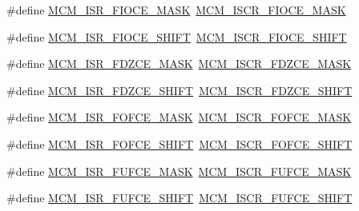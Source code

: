 \begin{DoxyCompactItemize}
\item 
\#define \mbox{\hyperlink{group___s_d_k___compatibility___symbols_ga8c2d933b91a6be29be3c45a9120d1a6d}{M\+C\+M\+\_\+\+I\+S\+R\+\_\+\+F\+I\+O\+C\+E\+\_\+\+M\+A\+SK}}~\mbox{\hyperlink{group___m_c_m___register___masks_gaf48976f7ac1761a6145eea9a6add5ff5}{M\+C\+M\+\_\+\+I\+S\+C\+R\+\_\+\+F\+I\+O\+C\+E\+\_\+\+M\+A\+SK}}
\item 
\#define \mbox{\hyperlink{group___s_d_k___compatibility___symbols_ga0d01a10f2c69f6ca26f2e7c8b94f2f2c}{M\+C\+M\+\_\+\+I\+S\+R\+\_\+\+F\+I\+O\+C\+E\+\_\+\+S\+H\+I\+FT}}~\mbox{\hyperlink{group___m_c_m___register___masks_ga97f10ab969b7c83eb9cde216807b215b}{M\+C\+M\+\_\+\+I\+S\+C\+R\+\_\+\+F\+I\+O\+C\+E\+\_\+\+S\+H\+I\+FT}}
\item 
\#define \mbox{\hyperlink{group___s_d_k___compatibility___symbols_ga3bc1a6b47a2b34387b9a9a4dfe7d9e15}{M\+C\+M\+\_\+\+I\+S\+R\+\_\+\+F\+D\+Z\+C\+E\+\_\+\+M\+A\+SK}}~\mbox{\hyperlink{group___m_c_m___register___masks_ga2ad0b7495aba7dacde7658c2a71db6bd}{M\+C\+M\+\_\+\+I\+S\+C\+R\+\_\+\+F\+D\+Z\+C\+E\+\_\+\+M\+A\+SK}}
\item 
\#define \mbox{\hyperlink{group___s_d_k___compatibility___symbols_gaec1aefd34fd89aacc598bcdc6ebcd331}{M\+C\+M\+\_\+\+I\+S\+R\+\_\+\+F\+D\+Z\+C\+E\+\_\+\+S\+H\+I\+FT}}~\mbox{\hyperlink{group___m_c_m___register___masks_ga12ce128ef5d64154df362b12c33aa526}{M\+C\+M\+\_\+\+I\+S\+C\+R\+\_\+\+F\+D\+Z\+C\+E\+\_\+\+S\+H\+I\+FT}}
\item 
\#define \mbox{\hyperlink{group___s_d_k___compatibility___symbols_gaad457cfff1c2d9349ece02993cc593a0}{M\+C\+M\+\_\+\+I\+S\+R\+\_\+\+F\+O\+F\+C\+E\+\_\+\+M\+A\+SK}}~\mbox{\hyperlink{group___m_c_m___register___masks_ga7c59e8eefce78e605951ecf8c9da1f00}{M\+C\+M\+\_\+\+I\+S\+C\+R\+\_\+\+F\+O\+F\+C\+E\+\_\+\+M\+A\+SK}}
\item 
\#define \mbox{\hyperlink{group___s_d_k___compatibility___symbols_ga818184249ac03775dce58bbe4c7dbfb7}{M\+C\+M\+\_\+\+I\+S\+R\+\_\+\+F\+O\+F\+C\+E\+\_\+\+S\+H\+I\+FT}}~\mbox{\hyperlink{group___m_c_m___register___masks_gab83f7a7d4986544ad6d5a3972d72ced3}{M\+C\+M\+\_\+\+I\+S\+C\+R\+\_\+\+F\+O\+F\+C\+E\+\_\+\+S\+H\+I\+FT}}
\item 
\#define \mbox{\hyperlink{group___s_d_k___compatibility___symbols_gad5dd19766af96cb8cdec78954064cfab}{M\+C\+M\+\_\+\+I\+S\+R\+\_\+\+F\+U\+F\+C\+E\+\_\+\+M\+A\+SK}}~\mbox{\hyperlink{group___m_c_m___register___masks_ga9fa9ddc6391e5958245ccd332ebcd575}{M\+C\+M\+\_\+\+I\+S\+C\+R\+\_\+\+F\+U\+F\+C\+E\+\_\+\+M\+A\+SK}}
\item 
\#define \mbox{\hyperlink{group___s_d_k___compatibility___symbols_ga6dedcd01f8354cf840e86447f16977bc}{M\+C\+M\+\_\+\+I\+S\+R\+\_\+\+F\+U\+F\+C\+E\+\_\+\+S\+H\+I\+FT}}~\mbox{\hyperlink{group___m_c_m___register___masks_gaeeab14ab4de1fa7d2d9a5d2492730e74}{M\+C\+M\+\_\+\+I\+S\+C\+R\+\_\+\+F\+U\+F\+C\+E\+\_\+\+S\+H\+I\+FT}}

\end{DoxyCompactItemize}
